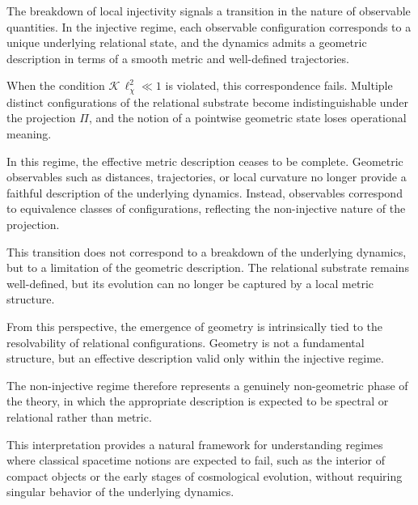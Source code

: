     The breakdown of local injectivity signals a transition in the nature of observable
    quantities.
    In the injective regime, each observable configuration corresponds to a unique
    underlying relational state, and the dynamics admits a geometric description in
    terms of a smooth metric and well-defined trajectories.

    When the condition $\mathcal{K}\,\ell_\chi^2 \ll 1$ is violated, this correspondence
    fails.
    Multiple distinct configurations of the relational substrate become indistinguishable
    under the projection $\Pi$, and the notion of a pointwise geometric state loses
    operational meaning.

    In this regime, the effective metric description ceases to be complete.
    Geometric observables such as distances, trajectories, or local curvature no longer
    provide a faithful description of the underlying dynamics.
    Instead, observables correspond to equivalence classes of configurations, reflecting
    the non-injective nature of the projection.

    This transition does not correspond to a breakdown of the underlying dynamics,
    but to a limitation of the geometric description.
    The relational substrate remains well-defined, but its evolution can no longer be
    captured by a local metric structure.

    From this perspective, the emergence of geometry is intrinsically tied to the
    resolvability of relational configurations.
    Geometry is not a fundamental structure, but an effective description valid only
    within the injective regime.

    The non-injective regime therefore represents a genuinely non-geometric phase of the
    theory, in which the appropriate description is expected to be spectral or relational
    rather than metric.

    This interpretation provides a natural framework for understanding regimes where
    classical spacetime notions are expected to fail, such as the interior of compact
    objects or the early stages of cosmological evolution, without requiring singular
    behavior of the underlying dynamics.
